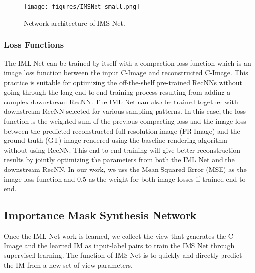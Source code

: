 \begin{figure}[t]
    \centering 
    \texttt{[image: figures/IMSNet\_small.png]}
    \caption{Network architecture of IMS Net.}
    \label{fig:ims-net}
\end{figure}

\subsubsection{Loss Functions}
The IML Net can be trained by itself with a compaction loss function which is an image loss function between the input C-Image and reconstructed C-Image. This practice is suitable for optimizing the off-the-shelf pre-trained RecNNs without going through the long end-to-end training process resulting from adding a complex downstream RecNN. The IML Net can also be trained together with downstream RecNN selected for various sampling patterns. In this case, the loss function is the weighted sum of the previous compacting loss and the image loss between the predicted reconstructed full-resolution image (FR-Image) and the ground truth (GT) image rendered using the baseline rendering algorithm without using RecNN. This end-to-end training will give better reconstruction results by jointly optimizing the parameters from both the IML Net and the downstream RecNN. In our work, we use the Mean Squared Error (MSE) as the image loss function and 0.5 as the weight for both image losses if trained end-to-end.

\subsection{Importance Mask Synthesis Network}
Once the IML Net work is learned, we collect the view that generates the C-Image and the learned IM as input-label pairs to train the IMS Net through supervised learning. The function of IMS Net is to quickly and directly predict the IM from a new set of view parameters.

